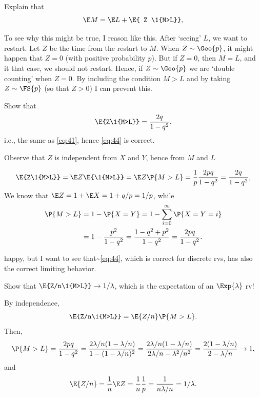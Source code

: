 \documentclass[a4paper]{article}
\begin{document}
\begin{exercise}
Explain that
\begin{equation}
\label{eq:44}
\E M = \E L + \E{ Z \1{M>L}},
\end{equation}
\begin{solution}
To see why this might be true, I reason like this.
After `seeing' \(L\), we want to restart.
Let \(Z\) be the time from the restart to \(M\).
When \(Z\sim \Geo{p}\), it might happen that \(Z=0\) (with positive probability \(p\)).
But if \(Z=0\), then \(M=L\), and it that case, we should not restart.
Hence, if \(Z\sim \Geo{p}\) we are `double counting' when \(Z=0\).
By including the condition \(M>L\) and by taking \(Z\sim\FS{p}\) (so that \(Z>0\)) I can prevent this.
\end{solution}
\end{exercise}


\begin{exercise}
Show that
\begin{equation*}
\E{Z\1{M>L}} = \frac{2q} {1-q^{2}},
\end{equation*}
i.e., the same as \cref{eq:41}, hence \cref{eq:44} is correct.
\begin{hint}
Observe that \(Z\)   is independent from \(X\) and \(Y\), hence from \(M\) and \(L\)
\end{hint}
\begin{solution}
  \begin{align*}
\E{Z\1{M>L}}  = \E Z \E{\1{M>L}} = \E Z \P{M>L} = \frac 1 p \frac{2pq}{1-q^{2}} = \frac{2q}{1-q^{2}},
  \end{align*}
We know that \(\E Z = 1 + \E X = 1 + q/p = 1/p\), while
\begin{align*}
\P{M>L}
&= 1-\P{X=Y} = 1-\sum_{i=0}^{\infty} \P{X=Y=i} \\
&= 1-\frac{p^{2}}{1-q^{2}} = \frac{1 - q^{2} + p^{2}}{1-q^{2}} = \frac{2pq}{1-q^{2}}.
\end{align*}
\end{solution}
\end{exercise}


 happy, but I want to see that\textasciitilde{}\eqref{eq:44}, which is correct for discrete rvs, has also the correct limiting behavior.
\begin{exercise}
Show that \(\E{Z/n\1{M>L}} \to 1/\lambda\), which is the expectation of an \(\Exp{\lambda}\) rv!
\begin{solution}
By independence,
  \begin{equation*}
\E{Z/n\1{M>L}} = \E{Z/n} \P{M>L}.
  \end{equation*}
Then,
\begin{equation*}
\P{M>L}   = \frac{2pq}{1-q^{2}}
= \frac{2\lambda/n (1-\lambda/n)}{1-(1-\lambda/n)^{2}}
= \frac{2\lambda/n (1-\lambda/n)}{2\lambda/n -\lambda^{2}/n^{2}}
= \frac{2 (1-\lambda/n)}{2 -\lambda/n}  \to 1,
\end{equation*}
and
\begin{equation*}
\E{Z/n} = \frac 1 n \E Z = \frac 1 n \frac 1 p = \frac 1 {n \lambda/ n} = 1/\lambda.
\end{equation*}
\end{solution}
\end{exercise}
\end{document}
